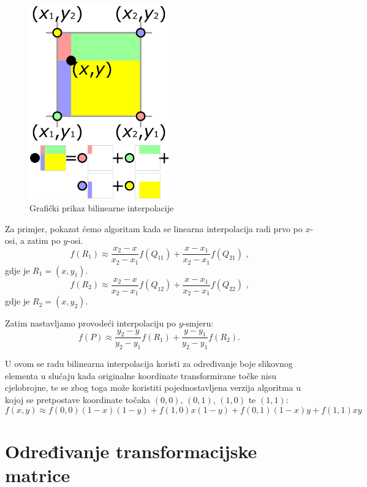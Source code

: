 \begin{figure}[ht]
\centering
\includegraphics[width=6cm]{figures/bilint_visualization.png}
\caption{Grafički prikaz bilinearne interpolacije}
\label{fig:bilintPrikaz}
\end{figure}

Za primjer, pokazat ćemo algoritam kada se linearna interpolacija radi prvo po $x$-osi, a zatim po $y$-osi.
\begin{equation}
f(R_1) \approx \frac{x_2 - x}{x_2 - x_1} f(Q_{11}) + \frac{x - x_1}{x_2 - x_1} f(Q_{21})\text{ ,}
\end{equation}
gdje je  $R_1 = (x, y_1)$.
\begin{equation}
f(R_2) \approx \frac{x_2 - x}{x_2 - x_1} f(Q_{12}) + \frac{x - x_1}{x_2 - x_1} f(Q_{22})\text{ ,}
\end{equation}
gdje je  $R_2 = (x, y_2)$.

Zatim nastavljamo provodeći interpolaciju po $y$-smjeru:
\begin{equation}
f(P) \approx \frac{y_2 - y}{y_2 - y_1} f(R_1) + \frac{y - y_1}{y_2 - y_1} f(R_2).
\end{equation}

U ovom se radu bilinearna interpolacija koristi za određivanje boje slikovnog elementa  u slučaju kada originalne koordinate transformirane točke nisu cjelobrojne, te se zbog toga može koristiti pojednostavljena verzija algoritma u kojoj se pretpostave koordinate točaka $(0,0)$, $(0, 1)$, $(1, 0)$ te $(1, 1)$:
\begin{equation}
f(x, y) \approx f(0, 0)(1 - x)(1 -  y) + f(1, 0) x (1 - y) + f(0, 1) (1 - x) y + f(1, 1) x y
\end{equation}

\section{Određivanje transformacijske matrice}

